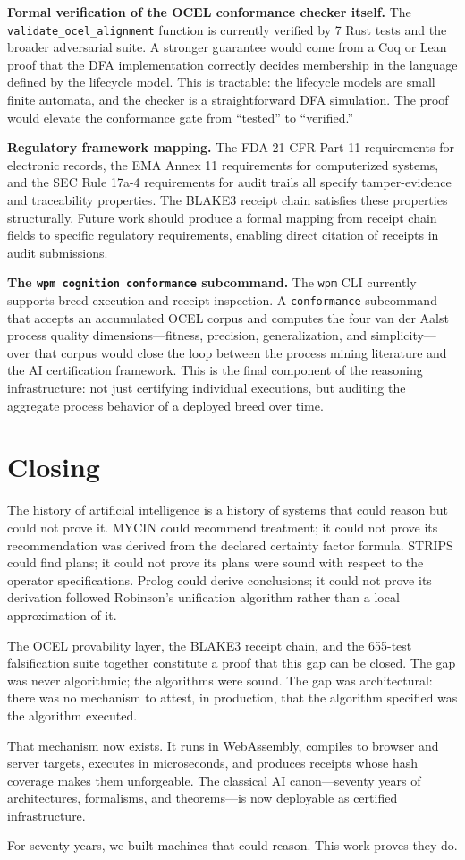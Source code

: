 \textbf{Formal verification of the OCEL conformance checker itself.} The \texttt{validate\_ocel\_alignment} function is currently verified by 7 Rust tests and the broader adversarial suite. A stronger guarantee would come from a Coq or Lean proof that the DFA implementation correctly decides membership in the language defined by the lifecycle model. This is tractable: the lifecycle models are small finite automata, and the checker is a straightforward DFA simulation. The proof would elevate the conformance gate from ``tested'' to ``verified.''

\textbf{Regulatory framework mapping.} The FDA 21 CFR Part 11 requirements for electronic records, the EMA Annex 11 requirements for computerized systems, and the SEC Rule 17a-4 requirements for audit trails all specify tamper-evidence and traceability properties. The BLAKE3 receipt chain satisfies these properties structurally. Future work should produce a formal mapping from receipt chain fields to specific regulatory requirements, enabling direct citation of receipts in audit submissions.

\textbf{The \texttt{wpm cognition conformance} subcommand.} The \texttt{wpm} CLI currently supports breed execution and receipt inspection. A \texttt{conformance} subcommand that accepts an accumulated OCEL corpus and computes the four van der Aalst process quality dimensions---fitness, precision, generalization, and simplicity---over that corpus would close the loop between the process mining literature and the AI certification framework. This is the final component of the reasoning infrastructure: not just certifying individual executions, but auditing the aggregate process behavior of a deployed breed over time.

\section{Closing}
\label{sec:closing}

The history of artificial intelligence is a history of systems that could reason but could not prove it. MYCIN could recommend treatment; it could not prove its recommendation was derived from the declared certainty factor formula. STRIPS could find plans; it could not prove its plans were sound with respect to the operator specifications. Prolog could derive conclusions; it could not prove its derivation followed Robinson's unification algorithm rather than a local approximation of it.

The OCEL provability layer, the BLAKE3 receipt chain, and the 655-test falsification suite together constitute a proof that this gap can be closed. The gap was never algorithmic; the algorithms were sound. The gap was architectural: there was no mechanism to attest, in production, that the algorithm specified was the algorithm executed.

That mechanism now exists. It runs in WebAssembly, compiles to browser and server targets, executes in microseconds, and produces receipts whose hash coverage makes them unforgeable. The classical AI canon---seventy years of architectures, formalisms, and theorems---is now deployable as certified infrastructure.

For seventy years, we built machines that could reason. This work proves they do.
